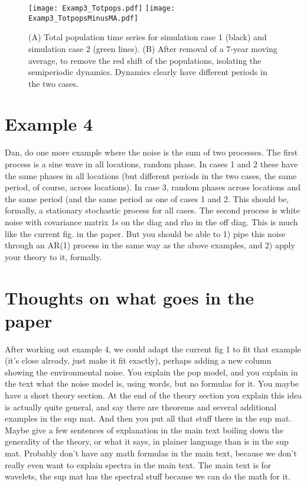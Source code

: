 \documentclass[letterpaper,11pt]{article}
\begin{document}
\begin{figure}
\texttt{[image: Examp3\_Totpops.pdf]}
\texttt{[image: Examp3\_TotpopsMinusMA.pdf]}
\caption{(A) Total population time series for simulation case 1 (black) and simulation case 2 (green lines). (B) After removal of a 7-year moving average, to remove the red
shift of the populations, isolating the semiperiodic dynamics. Dynamics clearly have different periods in the two cases. }\label{fig:example3_popts}
\end{figure}

\section{Example 4}

Dan, do one more example where the noise is the sum of two processes. The
first process is a sine wave in all locations, random phase. In cases 1 and 2 these have
the same phases in all locations (but different periods in the two cases, the same
period, of course, across locations). In case 3, random phases across locations and
the same period (and the same period as one of cases 1 and 2. This should be, 
formally, a stationary stochastic process for all cases. The second process 
is white noise with covariance matrix 1s on the diag and rho in the off diag.
This is much like the current fig. in the paper. But you should be able to
1) pipe this noise through an AR(1) process in the same way as the above examples, and
2) apply your theory to it, formally. 

\section{Thoughts on what goes in the paper}

After working out example 4, we could adapt the current fig 1 to fit that example (it's close already, just make it fit exactly), perhaps adding a new column showing the environmental noise. You explain the pop model, and you explain in the text what the noise model is, using words, but no formulas for it. You maybe have a short theory section. At the end of the theory section you explain this idea is actually quite general, and say there are theorems and several additional examples in the sup mat. And then you put all that stuff there in the sup mat. Maybe give a few sentences of explanation in the main
text boiling down the generality of the theory, or what it says, in plainer language than is in the sup mat. Probably don't have any math formulas in the main text, because we don't really even want to explain spectra in the main text. The main text is for wavelets, the sup mat has the spectral stuff because we can do the math for it.
\end{document}
